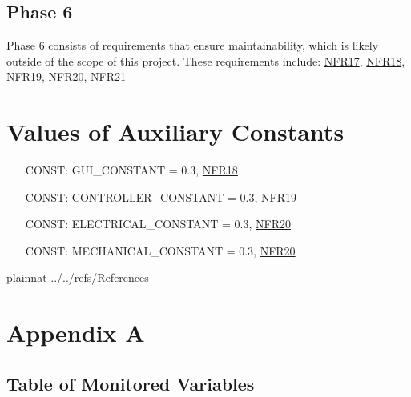 \documentclass[12pt]{article}
\newcounter{constnum} %
\begin{document}
\subsection{Phase 6}
Phase 6 consists of requirements that ensure maintainability, which is likely outside of the scope of this project. These requirements include: \hyperref[NFR17]{NFR17}, \hyperref[NFR18]{NFR18}, \hyperref[NFR19]{NFR19}, \hyperref[NFR20]{NFR20}, \hyperref[NFR21]{NFR21}

\section{Values of Auxiliary Constants}

\begin{itemize}
\setlength{\itemindent}{0.5in} \item[CONST\refstepcounter{constnum}\theconstnum\label{LC_meaningfulLabel}:] GUI\_CONSTANT = 0.3, \hyperref[NFR18]{NFR18}
\item[CONST\refstepcounter{constnum}\theconstnum\label{LC_meaningfulLabel}:] CONTROLLER\_CONSTANT = 0.3, \hyperref[NFR19]{NFR19}
\item[CONST\refstepcounter{constnum}\theconstnum\label{LC_meaningfulLabel}:] ELECTRICAL\_CONSTANT = 0.3, \hyperref[NFR20]{NFR20}
\item[CONST\refstepcounter{constnum}\theconstnum\label{LC_meaningfulLabel}:] MECHANICAL\_CONSTANT = 0.3, \hyperref[NFR21]{NFR20}
\end{itemize}

\newpage

 {plainnat}
 {../../refs/References}

\newpage

\newpage{}
\section{Appendix A}

\subsection{Table of Monitored Variables}
\end{document}
